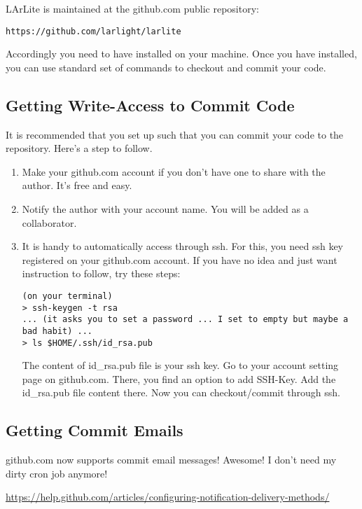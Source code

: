 LArLite is maintained at the github.com public \git repository:
\begin{lstlisting}
https://github.com/larlight/larlite
\end{lstlisting}
Accordingly you need to have \git installed on your machine.
Once you have \git installed, you can use standard set of commands to checkout and commit your code.\\




\subsection{Getting Write-Access to Commit Code}

It is recommended that you set up such that you can commit your code to the repository.
Here's a step to follow.

\begin{enumerate}
\item Make your github.com account if you don't have one to share with the author. It's free and easy.
\item Notify the author with your account name. You will be added as a collaborator.
\item It is handy to automatically access through ssh. For this, you need ssh key registered on your github.com account. If you have no idea and just want instruction to follow, try these steps:
\begin{lstlisting}
(on your terminal)
> ssh-keygen -t rsa
... (it asks you to set a password ... I set to empty but maybe a bad habit) ...
> ls $HOME/.ssh/id_rsa.pub
\end{lstlisting}
The content of id\_rsa.pub file is your ssh key. Go to your account setting page on github.com. There, you find an option to add SSH-Key. Add the id\_rsa.pub file content there. Now you can checkout/commit through ssh.
\end{enumerate}

\subsection{Getting Commit Emails}

{\ttfamily github.com} now supports commit email messages! Awesome! I don't need my dirty cron job anymore!

\href{https://help.github.com/articles/configuring-notification-delivery-methods/}{https://help.github.com/articles/configuring-notification-delivery-methods/}

